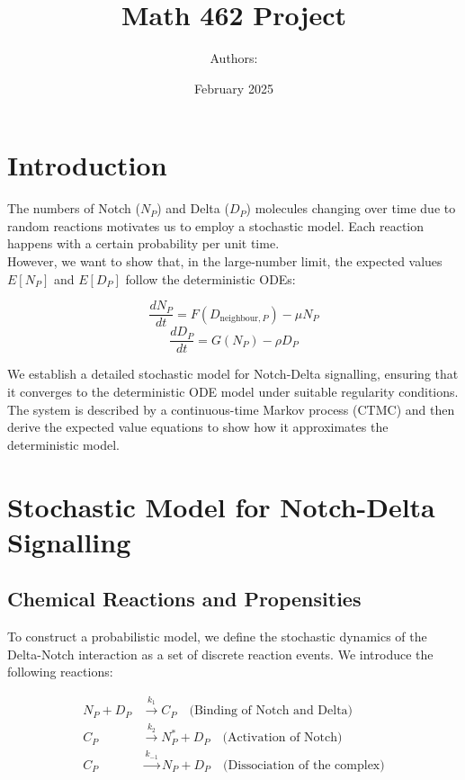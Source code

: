\documentclass{article}
\title{Math 462 Project}
\author{Authors:}
\date{February 2025}
\begin{document}
\maketitle

\section{Introduction}
The numbers of Notch (\(N_P\)) and Delta (\(D_P\)) molecules changing over time due to random reactions motivates us to employ a stochastic model. Each reaction happens with a certain probability per unit time. \\ 
However, we want to show that, in the large-number limit, the expected values \(E[N_P]\) and \(E[D_P]\) follow the deterministic ODEs:

\[
\frac{dN_P}{dt} = F(D_{\text{neighbour},P}) - \mu N_P
\]
\[
\frac{dD_P}{dt} = G(N_P) - \rho D_P
\]

\hfill

We establish a detailed stochastic model for Notch-Delta signalling, ensuring that it converges to the deterministic ODE model under suitable regularity conditions. The system is described by a continuous-time Markov process (CTMC) and then derive the expected value equations to show how it approximates the deterministic model.

\section{Stochastic Model for Notch-Delta Signalling}
\subsection{Chemical Reactions and Propensities}
To construct a probabilistic model, we define the stochastic dynamics of the Delta-Notch interaction as a set of discrete reaction events. We introduce the following reactions:

\begin{align*}
  N_{P} + D_{P} &\xrightarrow{k_1} C_{P} \quad \text{(Binding of Notch and Delta)} \\
  C_{P} &\xrightarrow{k_2} N_{P}^{*} + D_{P} \quad \text{(Activation of Notch)} \\
  C_{P} &\xrightarrow{k_{-1}} N_{P} + D_{P} \quad \text{(Dissociation of the complex)}
\end{align*}

\medskip

\color{red}
\end{document}
